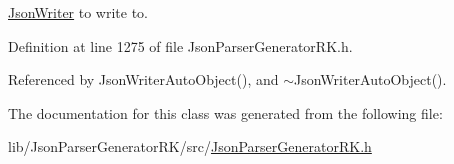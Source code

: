 \hyperlink{class_json_writer}{Json\+Writer} to write to. 



Definition at line 1275 of file Json\+Parser\+Generator\+R\+K.\+h.



Referenced by Json\+Writer\+Auto\+Object(), and $\sim$\+Json\+Writer\+Auto\+Object().



The documentation for this class was generated from the following file\+:\begin{DoxyCompactItemize}
\item 
lib/\+Json\+Parser\+Generator\+R\+K/src/\hyperlink{_json_parser_generator_r_k_8h}{Json\+Parser\+Generator\+R\+K.\+h}\end{DoxyCompactItemize}
